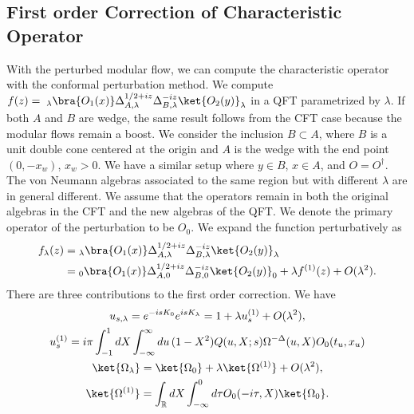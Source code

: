 \documentclass[a4paper,11pt]{article}
\theoremstyle{definition}
\newcommand{\KL}[1]{\textcolor{brown}{#1}}
\begin{document}





\subsection{First order Correction of Characteristic Operator}
With the perturbed modular flow, we can compute the characteristic operator with the conformal perturbation method. We compute $f(z)= \;_\lambda\bra{O_1(x)}\Delta_{A,\lambda}^{1/2+iz}\Delta_{B,\lambda}^{-iz}\ket{O_2(y)}_\lambda$ in a QFT parametrized by $\lambda$. If both $A$ and $B$ are wedge, the same result follows from the CFT case because the modular flows remain a boost. We consider the inclusion $B\subset A$, where $B$ is a unit double cone centered at the origin and $A$ is the wedge with the end point $(0,-x_w)$, $x_w >0$. We have a similar setup where $y\in B$, $x\in A$, and $O=O^\dagger$. The von Neumann algebras associated to the same region but with different $\lambda$ are in general different. We assume that the operators remain in both the original algebras in the CFT and the new algebras of the QFT. We denote the primary operator of the perturbation to be $O_0$. We expand the function perturbatively as
\begin{align}
    f_\lambda(z) =&\;_\lambda\bra{O_1(x)}\Delta_{A,\lambda}^{1/2+iz}\Delta_{B,\lambda}^{-iz}\ket{O_2(y)}_\lambda \\
    =&\; _0\bra{O_1(x)}\Delta_{A,0}^{1/2+iz}\Delta_{B,0}^{-iz}\ket{O_2(y)}_0 + \lambda f^{(1)}(z) + O(\lambda^2).
\end{align}
There are three contributions to the first order correction. We have
\begin{gather}
    u_{s,\lambda} = e^{-isK_0}e^{isK_\lambda} = 1 + \lambda u_{s}^{(1)} +O(\lambda^2),\\
    u_{s}^{(1)} = i\pi  \int_{-1}^1 dX \int_{-\infty}^{\infty} du \, (1-X^2) Q(u,X;s) \Omega^{-\Delta}(u,X) O_0(t_u,x_u)\\
    \ket{\Omega_\lambda} = \ket{\Omega_0} + \lambda\ket{\Omega^{(1)}} + O(\lambda^2),\\
    \ket{\Omega^{(1)}} = \int_\mathbb{R} dX \int_{-\infty}^{0} d\tau O_0(-i\tau,X) \ket{\Omega_0}.
\end{gather}
\end{document}
